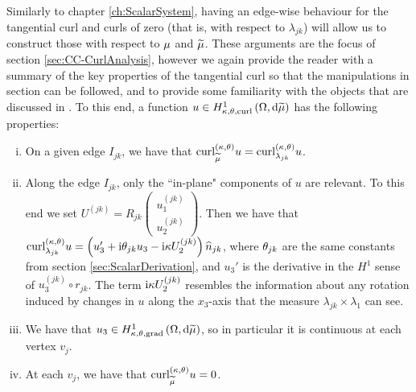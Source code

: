 Similarly to chapter \ref{ch:ScalarSystem}, having an edge-wise behaviour for the tangential curl and curls of zero (that is, with respect to $\lambda_{jk}$) will allow us to construct those with respect to $\mu$ and $\widetilde{\mu}$.
These arguments are the focus of section \ref{sec:CC-CurlAnalysis}, however we again provide the reader with a summary of the key properties of the tangential curl so that the manipulations in section  can be followed, and to provide some familiarity with the objects that are discussed in .
To this end, a function $u\in H^1_{\kappa,\theta,\mathrm{curl}}\left( \Omega, \mathrm{d}\widetilde{\mu} \right)$ has the following properties:
\begin{enumerate}[(i)]
	\item On a given edge $I_{jk}$, we have that $\mathrm{curl}_{\widetilde{\mu}}^{\left( \kappa, \theta \right)}u = \mathrm{curl}_{\lambda_{jk}}^{\left( \kappa, \theta \right)}u$.
	\item Along the edge $I_{jk}$, only the ``in-plane" components of $u$ are relevant.
	To this end we set $U^{(jk)} = R_{jk}\begin{pmatrix} u^{(jk)}_1 \\ u^{(jk)}_2 \end{pmatrix}$.
	Then we have that $\mathrm{curl}_{\lambda_{jk}}^{\left( \kappa, \theta \right)}u = \left( u_3' + \mathrm{i}\theta_{jk}u_3 - \mathrm{i}\kappa U^{(jk)}_2 \right)\widehat{n}_{jk}$, where $\theta_{jk}$ are the same constants from section \ref{sec:ScalarDerivation}, and $u_3'$ is the derivative in the $H^1$ sense of $u^{(jk)}_3\circ r_{jk}$.
	The term $\mathrm{i}\kappa U^{(jk)}_2$ resembles the information about any rotation induced by changes in $u$ along the $x_3$-axis that the measure $\lambda_{jk}\times\lambda_1$ can see.
	\item We have that $u_3\in H^1_{\kappa,\theta,\mathrm{grad}}\left( \Omega, \mathrm{d}\widetilde{\mu} \right)$, so in particular it is continuous at each vertex $v_j$.
	\item At each $v_j$, we have that $\mathrm{curl}_{\widetilde{\mu}}^{\left( \kappa, \theta \right)}u = 0$.
\end{enumerate}
